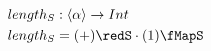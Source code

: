 \documentclass[preview]{standalone}
\begin{document}
\begin{align*}
  length_S &: \vect{\alpha} \rightarrow Int \\
  length_S &= (+) \redS \cdot (1) \fMapS
\end{align*}
\end{document}
